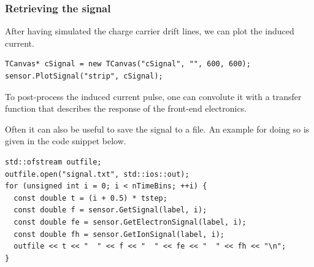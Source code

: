 \subsubsection{Retrieving the signal}
After having simulated the charge carrier drift lines, 
we can plot the induced current.
\begin{lstlisting}
TCanvas* cSignal = new TCanvas("cSignal", "", 600, 600);
sensor.PlotSignal("strip", cSignal);
\end{lstlisting}

To post-process the induced current pulse, one can convolute 
it with a transfer function that describes the response 
of the front-end electronics.

Often it can also be useful to save the signal to a file. 
An example for doing so is given in the code snippet below.
\begin{lstlisting}
std::ofstream outfile;
outfile.open("signal.txt", std::ios::out);
for (unsigned int i = 0; i < nTimeBins; ++i) {
  const double t = (i + 0.5) * tstep;
  const double f = sensor.GetSignal(label, i);
  const double fe = sensor.GetElectronSignal(label, i);
  const double fh = sensor.GetIonSignal(label, i);
  outfile << t << "  " << f << "  " << fe << "  " << fh << "\n";
}
\end{lstlisting}

